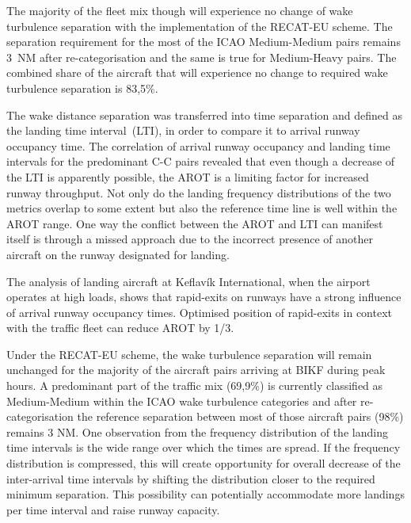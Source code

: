 The majority of the fleet mix though will experience no change of wake turbulence separation with the implementation of the RECAT-EU scheme. The separation requirement for the most of the ICAO Medium-Medium pairs remains 3~NM after re-categorisation and the same is true for Medium-Heavy pairs. The combined share of the aircraft that will experience no change to required wake turbulence separation is 83,5\%. 

The wake distance separation was transferred into time separation and defined as the landing time interval~(LTI), in order to compare it to arrival runway occupancy time.
The correlation of arrival runway occupancy and landing time intervals for the predominant C-C pairs revealed that even though a decrease of the LTI is apparently possible, the AROT is a limiting factor for increased runway throughput. Not only do the landing frequency distributions of the two metrics overlap to some extent but also the reference time line is well within the AROT range. One way the conflict between the AROT and LTI can manifest itself is through a missed approach due to the incorrect presence of another aircraft on the runway designated for landing.

The analysis of landing aircraft at Keflavík International, when the airport operates at high loads, shows that rapid-exits on runways have a strong influence of arrival runway occupancy times. Optimised position of rapid-exits in context with the traffic fleet can reduce AROT by 1/3.%

Under the RECAT-EU scheme, the wake turbulence separation will remain unchanged for the majority of the aircraft pairs arriving at BIKF during peak hours. A predominant part of the traffic mix (69,9\%) is currently classified as Medium-Medium within the ICAO wake turbulence categories and after re-categorisation the reference separation between most of those aircraft pairs (98\%) remains 3 NM. One observation from the frequency distribution of the landing time intervals is the wide range over which the times are spread. If the frequency distribution is compressed, this will create opportunity for overall decrease of the inter-arrival time intervals by shifting the distribution closer to the required minimum separation. This possibility can potentially accommodate more landings per time interval and raise runway capacity.


